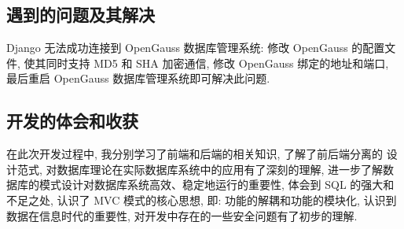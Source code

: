 \subsection{遇到的问题及其解决}
Django 无法成功连接到 OpenGauss 数据库管理系统:
修改 OpenGauss 的配置文件, 使其同时支持 MD5 和 SHA 加密通信,
修改 OpenGauss 绑定的地址和端口, 最后重启 OpenGauss
数据库管理系统即可解决此问题.

\subsection{开发的体会和收获}
在此次开发过程中, 我分别学习了前端和后端的相关知识, 了解了前后端分离的
设计范式, 对数据库理论在实际数据库系统中的应用有了深刻的理解,
进一步了解数据库的模式设计对数据库系统高效、稳定地运行的重要性,
体会到 SQL 的强大和不足之处, 认识了 MVC 模式的核心思想, 即:
功能的解耦和功能的模块化,
认识到数据在信息时代的重要性, 对开发中存在的一些安全问题有了初步的理解.
